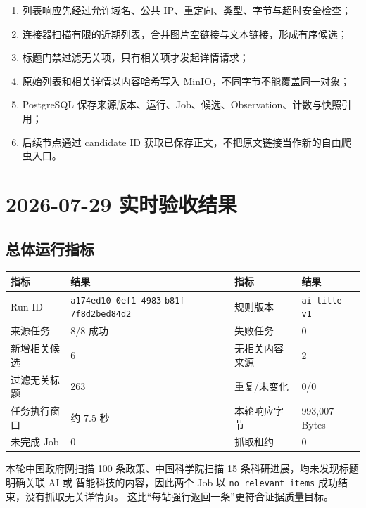 \documentclass[UTF8,11pt,a4paper,fontset=none]{ctexart}
\begin{document}
\begin{enumerate}[leftmargin=2em,itemsep=0.25em]
  \item 列表响应先经过允许域名、公共 IP、重定向、类型、字节与超时安全检查；
  \item 连接器扫描有限的近期列表，合并图片空链接与文本链接，形成有序候选；
  \item 标题门禁过滤无关项，只有相关项才发起详情请求；
  \item 原始列表和相关详情以内容哈希写入 MinIO，不同字节不能覆盖同一对象；
  \item PostgreSQL 保存来源版本、运行、Job、候选、Observation、计数与快照引用；
  \item 后续节点通过 candidate ID 获取已保存正文，不把原文链接当作新的自由爬虫入口。
\end{enumerate}

\section{2026-07-29 实时验收结果}

\subsection{总体运行指标}

\noindent\begin{tabularx}{\textwidth}{L{3.2cm}Y L{3.2cm}Y}
\toprule
{}
\color{white}\bfseries 指标 & \color{white}\bfseries 结果 &
\color{white}\bfseries 指标 & \color{white}\bfseries 结果 \\
\midrule
Run ID & \texttt{\footnotesize a174ed10-0ef1-4983}\newline
         \texttt{\footnotesize b81f-7f8d2bed84d2} & 规则版本 & \texttt{ai-title-v1} \\
来源任务 & 8/8 成功 & 失败任务 & 0 \\
新增相关候选 & 6 & 无相关内容来源 & 2 \\
过滤无关标题 & 263 & 重复/未变化 & 0/0 \\
任务执行窗口 & 约 7.5 秒 & 本轮响应字节 & 993,007 Bytes \\
未完成 Job & 0 & 抓取租约 & 0 \\
\bottomrule
\end{tabularx}

\begin{infobox}
本轮中国政府网扫描 100 条政策、中国科学院扫描 15 条科研进展，均未发现标题明确关联 AI 或
智能科技的内容，因此两个 Job 以 \texttt{no\_relevant\_items} 成功结束，没有抓取无关详情页。
这比“每站强行返回一条”更符合证据质量目标。
\end{infobox}
\end{document}
